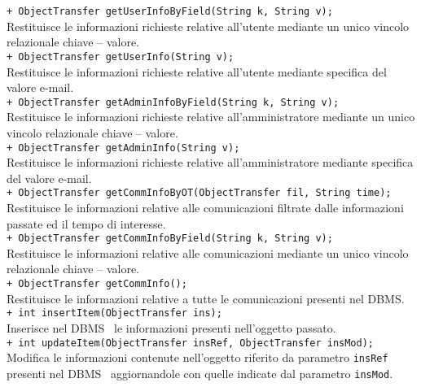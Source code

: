 {\begin{sloppypar}
{{{{\begin{itemize}
{				\texttt{+ ObjectTransfer getUserInfoByField(String k, String v);} \\ 
				Restituisce le informazioni richieste relative all'utente mediante un unico vincolo relazionale chiave – valore.\\ 
				
				\texttt{+ ObjectTransfer getUserInfo(String v);} \\
				Restituisce le informazioni richieste relative all'utente mediante specifica del valore e-mail.\\ 
				
				\texttt{+ ObjectTransfer getAdminInfoByField(String k, String v);} \\
				Restituisce le informazioni richieste relative all'amministratore mediante un unico vincolo relazionale chiave – valore.\\ 
				
				\texttt{+ ObjectTransfer getAdminInfo(String v);} \\
				Restituisce le informazioni richieste relative all'amministratore mediante specifica del valore e-mail.\\
	
				\texttt{+ ObjectTransfer getCommInfoByOT(ObjectTransfer fil, String time);} \\
				Restituisce le informazioni relative alle comunicazioni filtrate dalle informazioni passate ed il tempo di interesse.\\
				
				\texttt{+ ObjectTransfer getCommInfoByField(String k, String v);} \\
				Restituisce le informazioni relative alle comunicazioni mediante un unico vincolo relazionale chiave – valore.\\
				
				\texttt{+ ObjectTransfer getCommInfo();} \\
				Restituisce le informazioni relative a tutte le comunicazioni presenti nel DBMS\g.\\

				\texttt{+ int insertItem(ObjectTransfer ins);} \\
				Inserisce nel DBMS\g~ le informazioni presenti nell'oggetto passato.\\
				
				\texttt{+ int updateItem(ObjectTransfer insRef, ObjectTransfer insMod);} \\
				Modifica le informazioni contenute nell'oggetto riferito da parametro \texttt{insRef} presenti nel DBMS\g~ aggiornandole con quelle indicate dal parametro \texttt{insMod}.\\
				
}
\end{itemize}}}}}
\end{sloppypar}}

